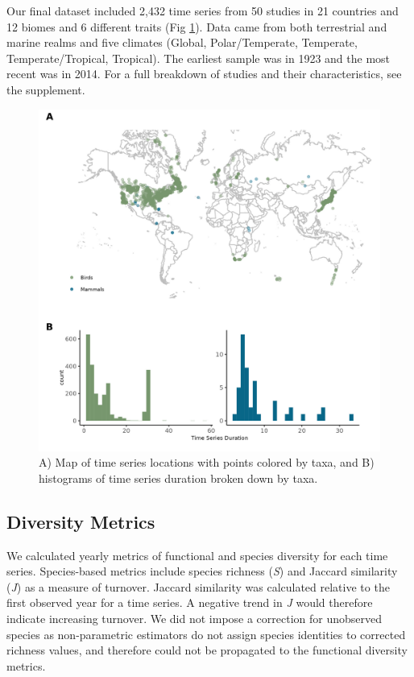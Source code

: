 \documentclass{article}
\begin{document}
Our final dataset included 2,432 time series from 50 studies in 21
countries and 12 biomes and 6 different traits (Fig \ref{fig:taxaMap}).
Data came from both terrestrial and marine realms and five climates
(Global, Polar/Temperate, Temperate, Temperate/Tropical, Tropical). The
earliest sample was in 1923 and the most recent was in 2014. For a full
breakdown of studies and their characteristics, see the supplement.

\begin{figure}
\includegraphics[width=\textwidth]{../../figures/study_map_hist} \caption{A) Map of time series locations with points colored by taxa, and B) histograms of time series duration broken down by taxa.}\label{fig:taxaMap}
\end{figure}

\hypertarget{diversity-metrics}{%
\subsection{Diversity Metrics}\label{diversity-metrics}}

We calculated yearly metrics of functional and species diversity for
each time series. Species-based metrics include species richness
(\emph{S}) and Jaccard similarity (\emph{J}) as a measure of turnover.
Jaccard similarity was calculated relative to the first observed year
for a time series. A negative trend in \emph{J} would therefore indicate
increasing turnover. We did not impose a correction for unobserved
species as non-parametric estimators do not assign species identities to
corrected richness values, and therefore could not be propagated to the
functional diversity metrics.
\end{document}
